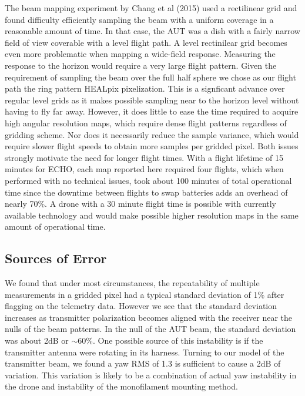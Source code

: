 \documentclass[preprint2,numberedappendix,tighten,twocolappendix]{aastex6}
\begin{document}
The beam mapping experiment by Chang et al (2015) used a rectilinear grid and found difficulty efficiently sampling the beam with a uniform coverage in a reasonable amount of time.   In that case, the AUT was a dish with a fairly narrow field of view coverable with a level flight path. A level rectinilear grid becomes even more problematic when mapping a wide-field response.  Measuring the response to the horizon would require a very large flight pattern. Given the requirement of sampling the beam over the full half sphere we chose as our flight path the ring pattern HEALpix pixelization. This is a signficant advance over regular level grids as it makes possible sampling near to the horizon level without having to fly far away. However, it does little to ease the time required to acquire high angular resolution maps, which require dense flight patterns regardless of gridding scheme. Nor does it necessarily reduce the sample variance, which would require slower flight speeds to obtain more samples per gridded pixel. Both issues strongly motivate the need for longer flight times.  With a flight lifetime of 15 minutes for ECHO, each map reported here required four flights, which when performed with no technical issues, took about 100 minutes of total operational time since the downtime between flights to swap batteries adds an overhead of nearly 70\%.  A drone with a 30 minute flight time is possible with currently available technology and would make possible higher resolution maps in the same amount of operational time.

\subsection{Sources of Error}

We found that under most circumstances, the repeatability of multiple measurements in a gridded pixel had a typical standard deviation of 1\% after flagging on the telemetry data. However we see that the standard deviation increases as transmitter polarization becomes aligned with the receiver near the nulls of the beam patterns. In the null of the AUT beam, the standard deviation was about 2dB or $\sim$60\%. One possible source of this instability is if the transmitter antenna were rotating in its harness. Turning to our model of the transmitter beam, we found a yaw RMS of 1.3\arcdeg{} is sufficient to cause a 2dB of variation. This variation is likely to be a combination of actual yaw instability in the drone and instability of the monofilament mounting method. 
\end{document}
